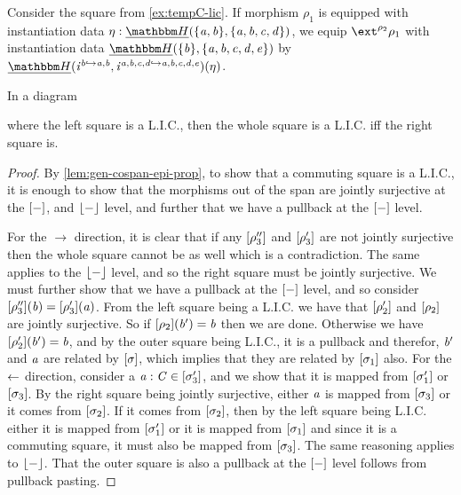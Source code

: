 \begin{example}
    Consider the square from \cref{ex:tempC-lic}.
    If morphism $\rho_1$ is equipped with instantiation data $\mvarM : \dheapF(\{\va, \vb\}, \{\va,\vb,\vc,\vd\})$,
    we equip $\ext^{\rho_2}\rho_1$ with instantiation data $\dheapF(\{\vb \}, \{\va,\vb,\vc, \vd, \ve\})$ by $\dheapF(\incl^{\vb \inclto \va,\vb}, \incl^{\va,\vb,\vc,\vd \inclto \va,\vb,\vc,\vd,\ve})(\mvarM)$.
\end{example}

\begin{lemma}\label{lem:lic-pasting}
    In a diagram
    where the left square is a L.I.C., then the whole square is a L.I.C. iff the right square is.
\end{lemma}
\begin{proof}
    By \cref{lem:gen-cospan-epi-prop}, to show that a commuting square is a L.I.C., it is enough to show that the morphisms out of the span are jointly surjective at the $[-]$, and $\lfloor-\rfloor$ level, and further that we have a pullback at the $[-]$ level.

    For the $\to$ direction, it is clear that if any $[\rho_3'']$ and $[\rho_3']$ are not jointly surjective then the whole square cannot be as well which is a contradiction.
    The same applies to the $\lfloor-\rfloor$ level, and so the right square must be jointly surjective.
    We must further show that we have a pullback at the $[-]$ level, and so consider $[\rho_3''](\mathit{b}) = [\rho_3'](\mathit{a})$.
    From the left square being a L.I.C. we have that $[\rho_2']$ and $[\rho_2]$ are jointly surjective.
    So if $[\rho_2](\mathit{b}') = \mathit{b}$ then we are done. 
    Otherwise we have $[\rho_2'](\mathit{b}') = \mathit{b}$, 
    and by the outer square being L.I.C., it is a pullback and therefor, 
    $\mathit{b}'$ and $\mathit{a}$ are related by $[\sigma]$, which implies that they are related by $[\sigma_1]$ also.
    \nl
    For the $\leftarrow$ direction, consider a $\mathit{a} : \mathit{C} \in [\sigma_3']$, and we show that it is mapped from $[\sigma_1']$ or $[\sigma_3]$.
    By the right square being jointly surjective, either $\mathit{a}$ is mapped from $[\sigma_3]$ or it comes from $[\sigma_2]$.
    If it comes from $[\sigma_2]$, then by the left square being L.I.C. either it is mapped from $[\sigma_1']$ or it is mapped from $[\sigma_1]$ and since it is a commuting square, it must also be mapped from $[\sigma_3]$.
    The same reasoning applies to $\lfloor-\rfloor$.
    That the outer square is also a pullback at the $[-]$ level follows from pullback pasting.
\end{proof}


